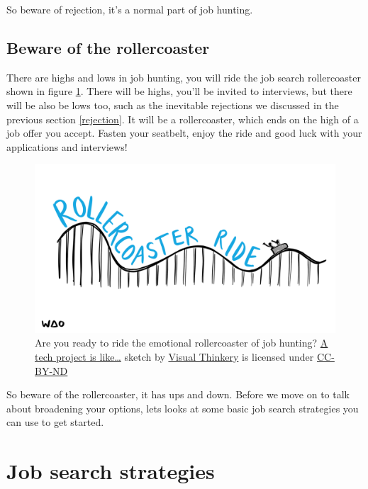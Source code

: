\documentclass[
]{book}
\begin{document}
So beware of rejection, it's a normal part of job hunting. 🤮

\hypertarget{rollercoaster}{%
\subsection{Beware of the rollercoaster}\label{rollercoaster}}

There are highs and lows in job hunting, you will ride the job search rollercoaster shown in figure \ref{fig:rollercoaster-fig}. There will be highs, you'll be invited to interviews, but there will be also be lows too, such as the inevitable rejections we discussed in the previous section \ref{rejection}. It will be a rollercoaster, which ends on the high of a job offer you accept. Fasten your seatbelt, enjoy the ride and good luck with your applications and interviews!

\begin{figure}

{\centering \includegraphics[width=0.98\linewidth]{images/Rollercoaster-ride} 

}

\caption{Are you ready to ride the emotional rollercoaster of job hunting? \href{https://bryanmmathers.com/rollercoaster-ride}{A tech project is like\ldots{}} sketch by \href{https://visualthinkery.com/}{Visual Thinkery} is licensed under \href{https://creativecommons.org/licenses/by-nd/4.0/}{CC-BY-ND}}\label{fig:rollercoaster-fig}
\end{figure}



So beware of the rollercoaster, it has ups and down. Before we move on to talk about broadening your options, lets looks at some basic job search strategies you can use to get started. 🎢

\hypertarget{strategies}{%
\section{Job search strategies}\label{strategies}}
\end{document}
